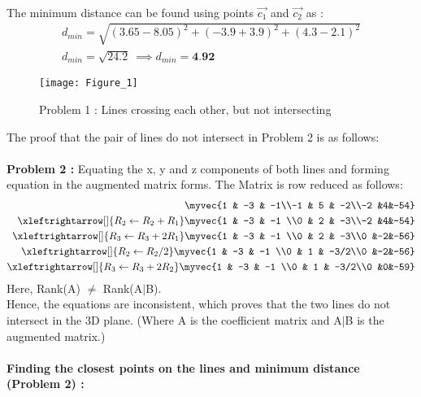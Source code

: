 \documentclass[journal,12pt,twocolumn]{IEEEtran}
\begin{document}
\\
The minimum distance can be found using points $\vec{c_1}$ and $\vec{c_2}$ as :
\begin{align}
    d_{min}=\sqrt{(3.65-8.05)^2+(-3.9+3.9)^2+(4.3-2.1)^2}\\
    d_{min}=\sqrt{24.2} \ \implies d_{min}=\textbf{4.92} 
\end{align}
\begin{figure}[ht]
\centering
\texttt{[image: Figure\_1]}
\caption{Problem 1 : Lines crossing each other, but not intersecting}
\label{Fig2}
\end{figure}
\newpage
The proof that the pair of lines do not intersect in Problem 2 is as follows:\\
\\
\textbf{Problem 2 :} Equating the x, y and z components of both lines and forming equation in the augmented matrix forms. The Matrix is row reduced as follows:\\
\begin{align}
\myvec{1 & -3 & -1\\-1 & 5 & -2\\-2 &4&-54}\\
\xleftrightarrow[]{R_2\leftarrow R_2+R_1}
\myvec{1 & -3 & -1 \\0 & 2 & -3\\-2 &4&-54}\\
\xleftrightarrow[]{R_3\leftarrow R_3+2R_1}   
\myvec{1 & -3 & -1 \\0 & 2 & -3\\0 &-2&-56}\\
\xleftrightarrow[]{R_2\leftarrow R_2/2}
\myvec{1 & -3 & -1 \\0 & 1 & -3/2\\0 &-2&-56}\\
\xleftrightarrow[]{R_3\leftarrow R_3+2R_2}
\myvec{1 & -3 & -1 \\0 & 1 & -3/2\\0 &0&-59}
\end{align} 
Here, Rank(A) $\neq$ Rank(A$\mid$B).
\\
Hence, the equations are inconsistent, which proves that the two lines do not intersect in the 3D plane. (Where A is the coefficient matrix and A$\mid$B is the augmented matrix.) \\
\\
\noindent
\textbf{Finding the closest points on the lines and minimum distance (Problem 2) :}\\
\\
\end{document}

